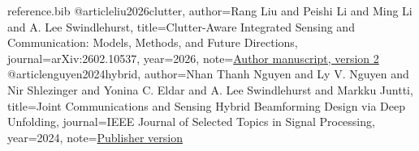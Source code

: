 \begin{filecontents*}{reference.bib}
@article{liu2026clutter,
 author={Rang Liu and Peishi Li and Ming Li and A. Lee Swindlehurst},
 title={Clutter-Aware Integrated Sensing and Communication: Models, Methods, and Future Directions},
 journal={arXiv:2602.10537}, year={2026},
 note={\href{https://arxiv.org/abs/2602.10537}{Author manuscript, version 2}}}
@article{nguyen2024hybrid,
 author={Nhan Thanh Nguyen and Ly V. Nguyen and Nir Shlezinger and Yonina C. Eldar and A. Lee Swindlehurst and Markku Juntti},
 title={Joint Communications and Sensing Hybrid Beamforming Design via Deep Unfolding},
 journal={IEEE Journal of Selected Topics in Signal Processing}, year={2024},
 note={\href{https://doi.org/10.1109/JSTSP.2024.3463403}{Publisher version}}}
\end{filecontents*}
\documentclass[11pt,letterpaper]{article}
\usepackage[T1]{fontenc}
\usepackage{lmodern,amsmath,amssymb,graphicx,tikz}
\usepackage[margin=0.82in]{geometry}
\usetikzlibrary{arrows.meta,positioning,shapes.geometric}
\usepackage[colorlinks=true,linkcolor=blue!45!black,citecolor=blue!45!black,urlcolor=blue!45!black]{hyperref}
\newcommand{\A}{\mathbf A}\newcommand{\W}{\mathbf W}\newcommand{\Q}{\mathbf Q}
\newcommand{\R}{\mathbf R}\newcommand{\uu}{\mathbf u}\newcommand{\qq}{\mathbf q}
\newcommand{\CN}{\mathcal{CN}}\newcommand{\tr}{\operatorname{tr}}
\newcommand{\scnr}{\operatorname{SCNR}}
\setlength{\parindent}{0pt}\setlength{\parskip}{4pt}\raggedbottom

